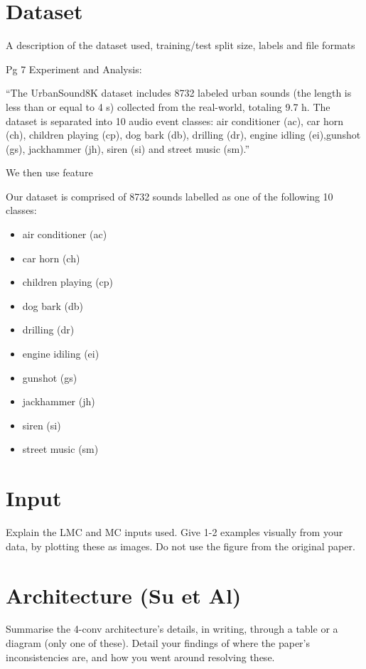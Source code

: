 \documentclass[conference]{IEEEtran}
\begin{document}
\section{Dataset}
A description of the dataset used, training/test split size, labels and file formats

Pg 7 Experiment and Analysis:

``The UrbanSound8K dataset includes 8732 labeled urban sounds (the length is less than or equal to 4 s) collected from the real-world, totaling 9.7 h. The dataset is separated into 10 audio event classes: air conditioner (ac), car horn (ch), children playing (cp), dog bark (db), drilling (dr), engine idling (ei),gunshot (gs), jackhammer (jh), siren (si) and street music (sm).''

We then use feature

Our dataset is comprised of 8732 sounds labelled as one of the following 10 classes:

\begin{itemize}
    \item air conditioner (ac)
    \item car horn (ch)
    \item children playing (cp)
    \item dog bark (db)
    \item drilling (dr)
    \item engine idiling (ei)
    \item gunshot (gs)
    \item jackhammer (jh)
    \item siren (si)
    \item street music (sm)
\end{itemize}



\section{Input}
Explain the LMC and MC inputs used. Give 1-2 examples visually from your data, by plotting these as images. Do not use the figure from the original paper. 

\section{Architecture (Su et Al)}
Summarise the 4-conv architecture’s details, in writing, through a table or a diagram (only one of these). Detail your findings of where the paper’s inconsistencies are, and how you went around resolving these. 
\end{document}
